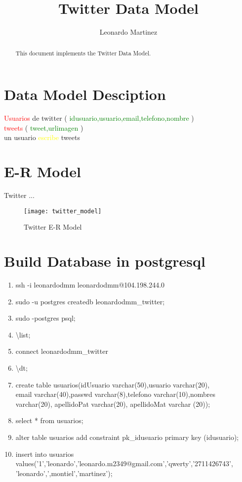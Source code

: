 \documentclass[10pt]{article}         %
\title{Twitter Data Model}
\author{Leonardo Martinez}
\begin{document}
\maketitle

\begin{abstract}
This document implements the Twitter Data Model.
\end{abstract}

\section{Data Model Desciption}


\textcolor{red}{Usuarios} de twitter ( \textcolor{green}{idusuario,usuario,email,telefono,nombre} )\\

\textcolor{red}{tweets} ( \textcolor{green}{tweet,urlimagen} )\\

un usuario \textcolor{yellow}{escribe} tweets

\section{E-R Model}

Twitter ...
\begin{figure}[h]
     \texttt{[image: twitter\_model]}
     \caption{Twitter E-R Model}
\end{figure}

\section{Build Database in postgresql}
\begin{enumerate}
	\item
	ssh -i leonardodmm leonardodmm@104.198.244.0
	\item
	sudo -u postgres createdb leonardodmm\_twitter;
	\item
	sudo -postgres psql;
	\item
	\textbackslash list;
	\item
	connect leonardodmm\_twitter
	\item
	\textbackslash dt;
	\item
	create table usuarios(idUsuario varchar(50),usuario varchar(20),\\email varchar(40),passwd varchar(8),telefono varchar(10),nombres varchar(20), apellidoPat varchar(20), apellidoMat varchar (20));
	\item
	select * from usuarios;
	\item
	alter table usuarios add constraint pk\_idusuario primary key (idusuario);
	\item
	insert into usuarios values('1','leonardo','leonardo.m2349@gmail.com','qwerty','2711426743',\\'leonardo',',montiel','martinez');
	
\end{enumerate}
\end{document}
